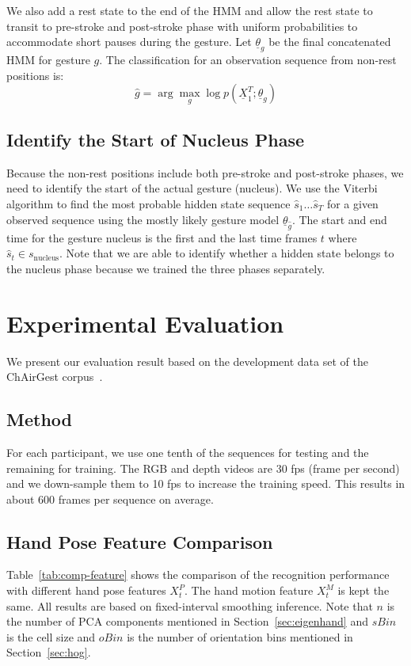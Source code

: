 \documentclass{acm_proc_article-sp}
\begin{document}
We also add a rest state to the end of the HMM and allow the rest state to transit to pre-stroke
and post-stroke phase with uniform probabilities to accommodate short pauses during the gesture.
Let $\underline{\theta}_g$ be the final concatenated HMM for gesture $g$. The classification
for an observation sequence from non-rest positions is:
\begin{displaymath}
\hat{g} = \arg\max_g\log p(\underline{X}_1^T; \underline{\theta}_g)
\end{displaymath}

\subsection{Identify the Start of Nucleus Phase}
Because the non-rest positions include both pre-stroke and post-stroke phases, we need
to identify the start of the actual gesture (nucleus). We use the Viterbi algorithm
to find the most probable hidden state sequence $\hat{s}_1\ldots\hat{s}_T$ for a given observed sequence using 
the mostly likely gesture model $\underline{\theta}_{\hat{g}}$. The start and end time for the gesture nucleus is
the first and the last time frames $t$ where $\hat{s}_t\in s_{\text{nucleus}}$. Note that
we are able to identify whether a hidden state belongs to the nucleus phase because we trained the three phases
separately.

\section{Experimental Evaluation}\label{sec:eval}
We present our evaluation result based on the development data set of the ChAirGest corpus~\cite{Ruffieux2013}.

\subsection{Method}
For each participant, we use
one tenth of the sequences for testing and the remaining for training. The RGB and depth videos are 30 fps (frame per second) and we down-sample them
to 10 fps to increase the training speed. This results in about 600 frames per sequence on average.

\subsection{Hand Pose Feature Comparison}
Table~\ref{tab:comp-feature} shows the comparison of the recognition performance with different hand pose features $X_t^P$. The 
hand motion feature $X_t^M$ is kept the same. All results are based on fixed-interval smoothing inference.
Note that $n$ is the number of PCA components mentioned in Section~\ref{sec:eigenhand} and $sBin$ is the
cell size and $oBin$ is the number of orientation bins mentioned in Section~\ref{sec:hog}.
\end{document}
